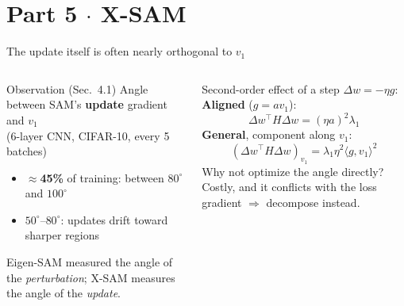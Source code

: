 \documentclass[aspectratio=169,10pt]{beamer}
\newcommand{\sectioninfo}{}
\newcommand{\sectionidea}{}
\newcommand{\partsection}[3]{%
  \renewcommand{\sectioninfo}{#2}%
  \renewcommand{\sectionidea}{#3}%
  \section{#1}}
\newcommand{\sh}[1]{\textcolor{sharp}{#1}}
\newcommand{\mt}[1]{\textcolor{muted}{#1}}
\begin{document}
\partsection{Part 5 $\cdot$ X-SAM}{Duan, Chen, Guan $\cdot$ Taiyuan University of Technology $\cdot$ arXiv preprint, 2026}{Look along the sharpest direction, but don't step along it.}

\begin{frame}{The update itself is often nearly orthogonal to $v_1$}
\begin{columns}[T]
\begin{column}{0.47\textwidth}
\begin{block}{Observation (Sec.\ 4.1)}
Angle between SAM's \textbf{update} gradient and $v_1$\\
\mt{\scriptsize (6-layer CNN, CIFAR-10, every 5 batches)}
\begin{itemize}
  \item $\approx$\textbf{45\%} of training: between $80^\circ$ and $100^\circ$
  \item $50^\circ$--$80^\circ$: updates drift toward \sh{sharper} regions
\end{itemize}
\end{block}
\mt{\small Eigen-SAM measured the angle of the \emph{perturbation}; X-SAM measures the angle of the \emph{update}.}
\end{column}
\begin{column}{0.5\textwidth}
Second-order effect of a step $\Delta w=-\eta g$:\\[4pt]
\textbf{Aligned} ($g=a v_1$):
\[ \Delta w^\top H\Delta w=(\eta a)^2\lambda_1 \]
\textbf{General}, component along $v_1$:
\[ (\Delta w^\top H\Delta w)_{v_1} = \lambda_1\eta^2\langle g,v_1\rangle^2 \]
\mt{\small Why not optimize the angle directly? Costly, and it conflicts with the loss gradient $\Rightarrow$ decompose instead.}
\end{column}
\end{columns}
\end{frame}
\end{document}
